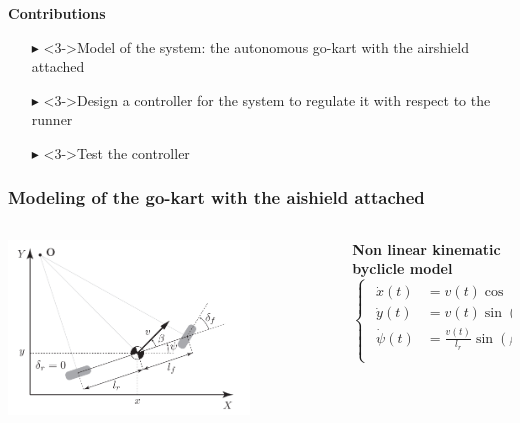 \documentclass[9pt, aspectratio=169]{beamer}
\begin{document}
\begin{frame}[t]
 \textcolor{emph@Thesis}{\textbf{\small{Contributions}}} \\
\vspace{0.3cm}
\footnotesize
\begin{itemize}
	\footnotesize
	\item[$\blacktriangleright$] <3->Model of the system: the autonomous go-kart with the airshield attached
	\item[$\blacktriangleright$] <3->Design a controller for the system to regulate it with respect to the runner
	\item[$\blacktriangleright$] <3->Test the controller
\end{itemize}
\end{frame}


\begin{frame}[t]
\frametitle{Modeling of the go-kart with the aishield attached}
\begin{columns}
\begin{column}{0.4\textwidth}
	\begin{center}
  		\includegraphics[width=0.75\textwidth]{Bycicle_scheme} 
	\end{center}
\end{column}
\begin{column}{0.6\textwidth}
 \hspace{0.5cm} \textbf{Non linear kinematic byclicle model}
	\begin{equation*}
	\begin{cases}
 		\begin{aligned}
			\dot{x}(t) &= v(t) \cos(\psi(t) + \beta(t)) \\
			\dot{y}(t) &= v(t) \sin(\psi(t) + \beta(t)) \\
			\dot{\psi}(t) &= \frac{v(t)}{l_r} \sin(\beta(t)) \\

\end{aligned}
\end{cases}
\end{equation*}
\end{column}
\end{columns}
\end{frame}
\end{document}
